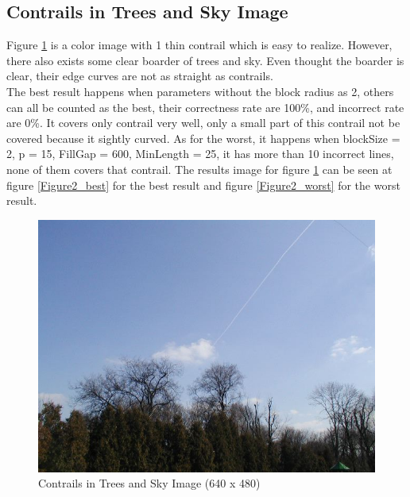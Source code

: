 \clearpage
\subsection{Contrails in Trees and Sky Image}

Figure \ref{figure2} is a color image with 1 thin contrail which is easy to realize. However, there also exists some clear boarder of trees and sky. Even thought the boarder is clear, their edge curves are not as straight as contrails.\\
The best result happens when parameters without the block radius as 2, others can all be counted as the best, their correctness rate are 100\%, and incorrect rate are 0\%. It covers only contrail very well, only a small part of this contrail not be covered because it sightly curved. As for the worst, it happens when blockSize = 2, p = 15, FillGap = 600, MinLength = 25, it has more than 10 incorrect lines, none of them covers that contrail. The results image for figure \ref{figure2} can be seen at figure \ref{Figure2_best} for the best result and figure \ref{Figure2_worst} for the worst result.

\begin{figure}[htb!]
\centering
\includegraphics[width=6in]{pic/figure2.jpg}
\caption{Contrails in Trees and Sky Image (640 x 480)}
\label{figure2}
\end{figure}


